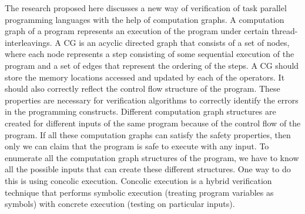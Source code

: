  The research proposed here discusses a new way of verification of task parallel programming languages with the help of computation graphs. A computation graph of a program represents an execution of the program under certain thread-interleavings. A CG is an acyclic directed graph that consists of a set of nodes, where each node represents a step consisting of some sequential execution of the program and a set of edges that represent the ordering of the steps. A CG should store the memory locations accessed and updated by each of the operators. It should also correctly reflect the control flow structure of the program. These properties are necessary for verification algorithms to correctly identify the errors in the programming constructs. Different computation graph structures are created for different inputs of the same program because of the control flow of the program. If all these computation graphs can satisfy the safety properties, then only we can claim that the program is safe to execute with any input. To enumerate all the computation graph structures of the program, we have to know all the possible inputs that can create these different structures. One way to do this is using concolic execution. Concolic execution is a hybrid verification technique that performs symbolic execution (treating program variables as symbols) with concrete execution (testing on particular inputs).
